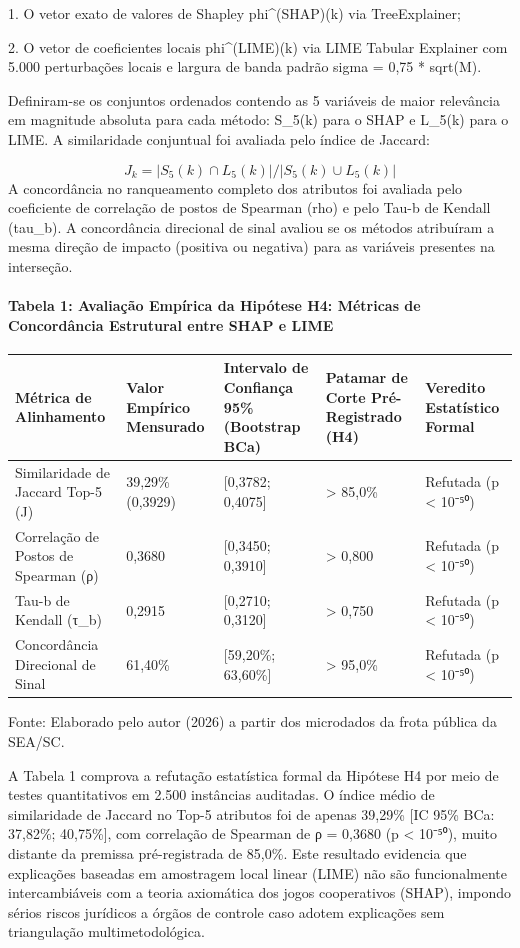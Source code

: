 \documentclass[10pt,a4paper,journal]{article}
\begin{document}
1. O vetor exato de valores de Shapley phi^(SHAP)(k) via TreeExplainer;

2. O vetor de coeficientes locais phi^(LIME)(k) via LIME Tabular Explainer com 5.000 perturbações locais e largura de banda padrão sigma = 0,75 * sqrt(M).

Definiram-se os conjuntos ordenados contendo as 5 variáveis de maior relevância em magnitude absoluta para cada método: S\_5(k) para o SHAP e L\_5(k) para o LIME. A similaridade conjuntual foi avaliada pelo índice de Jaccard:

\begin{equation}
J_{k} = | S_{5}(k) \cap L_{5}(k) | / | S_{5}(k) \cup L_{5}(k) | \label{eq:4}
\end{equation}
A concordância no ranqueamento completo dos atributos foi avaliada pelo coeficiente de correlação de postos de Spearman (rho) e pelo Tau-b de Kendall (tau\_b). A concordância direcional de sinal avaliou se os métodos atribuíram a mesma direção de impacto (positiva ou negativa) para as variáveis presentes na interseção.

\paragraph{Tabela 1: Avaliação Empírica da Hipótese H4: Métricas de Concordância Estrutural entre SHAP e LIME}
\begin{table}[htbp]
\centering
\small
\begin{tabular}{lllll}
\toprule
Métrica de Alinhamento & Valor Empírico Mensurado & Intervalo de Confiança 95\% (Bootstrap BCa) & Patamar de Corte Pré-Registrado (H4) & Veredito Estatístico Formal \\
\midrule
Similaridade de Jaccard Top-5 (J) & 39,29\% (0,3929) & [0,3782; 0,4075] & > 85,0\% & Refutada (p < 10⁻⁵⁰) \\
Correlação de Postos de Spearman (ρ) & 0,3680 & [0,3450; 0,3910] & > 0,800 & Refutada (p < 10⁻⁵⁰) \\
Tau-b de Kendall (τ\_b) & 0,2915 & [0,2710; 0,3120] & > 0,750 & Refutada (p < 10⁻⁵⁰) \\
Concordância Direcional de Sinal & 61,40\% & [59,20\%; 63,60\%] & > 95,0\% & Refutada (p < 10⁻⁵⁰) \\
\bottomrule
\end{tabular}
\end{table}
Fonte: Elaborado pelo autor (2026) a partir dos microdados da frota pública da SEA/SC.

A Tabela 1 comprova a refutação estatística formal da Hipótese H4 por meio de testes quantitativos em 2.500 instâncias auditadas. O índice médio de similaridade de Jaccard no Top-5 atributos foi de apenas 39,29\% [IC 95\% BCa: 37,82\%; 40,75\%], com correlação de Spearman de ρ = 0,3680 (p < 10⁻⁵⁰), muito distante da premissa pré-registrada de 85,0\%. Este resultado evidencia que explicações baseadas em amostragem local linear (LIME) não são funcionalmente intercambiáveis com a teoria axiomática dos jogos cooperativos (SHAP), impondo sérios riscos jurídicos a órgãos de controle caso adotem explicações sem triangulação multimetodológica.
\end{document}

